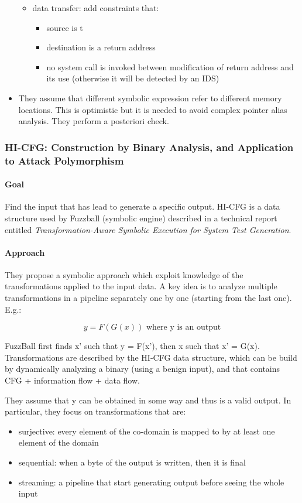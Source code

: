 \begin{itemize}
\begin{itemize}
    \item data transfer: add constraints that:
      \begin{itemize}
        \item source is t
        \item destination is a return address 
        \item no system call is invoked between modification of return address and its use (otherwise it will be detected by an IDS)
      \end{itemize}
  \end{itemize}
  \item They assume that different symbolic expression refer to different memory locations. This is optimistic but it is needed to avoid complex pointer alias analysis. They perform a posteriori check.

\end{itemize}

\subsubsection{\cite{FUZZBALL-13} HI-CFG: Construction by Binary Analysis, and Application to Attack Polymorphism} 

\paragraph{Goal}
Find the input that has lead to generate a specific output. HI-CFG is a data structure used by Fuzzball (symbolic engine) described in a technical report entitled {\em Transformation-Aware Symbolic Execution for System Test Generation}.

\paragraph{Approach}
They propose a symbolic approach which exploit knowledge of the transformations applied to the input data. A key idea is to analyze multiple transformations in a pipeline separately one by one (starting from the last one). E.g.:

\[y = F(G(x)) \text{ where y is an output} \]

FuzzBall first finds x' such that y = F(x'), then x such that x' = G(x). Transformations are described by the HI-CFG data structure, which can be build by dynamically analyzing a binary (using a benign input), and that contains CFG + information flow + data flow.

They assume that y can be obtained in some way and thus is a valid output. In particular, they focus on transformations that are:
\begin{itemize}
  \item surjective: every element of the co-domain is mapped to by at least one element of the domain
  \item sequential: when a byte of the output is written, then it is final
  \item streaming: a pipeline that start generating output before seeing the whole input
\end{itemize}

